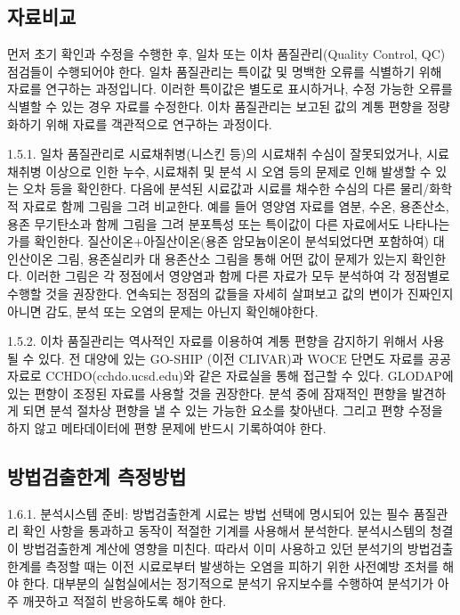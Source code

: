 \documentclass[
]{book}
\begin{document}
\hypertarget{uxc790uxb8ccuxbe44uxad50-1}{%
\subsection{자료비교}\label{uxc790uxb8ccuxbe44uxad50-1}}

먼저 초기 확인과 수정을 수행한 후, 일차 또는 이차 품질관리(Quality Control, QC) 점검들이 수행되어야 한다. 일차 품질관리는 특이값 및 명백한 오류를 식별하기 위해 자료를 연구하는 과정입니다. 이러한 특이값은 별도로 표시하거나, 수정 가능한 오류를 식별할 수 있는 경우 자료를 수정한다. 이차 품질관리는 보고된 값의 계통 편향을 정량화하기 위해 자료를 객관적으로 연구하는 과정이다.

1.5.1. 일차 품질관리로 시료채취병(니스킨 등)의 시료채취 수심이 잘못되었거나, 시료채취병 이상으로 인한 누수, 시료채취 및 분석 시 오염 등의 문제로 인해 발생할 수 있는 오차 등을 확인한다. 다음에 분석된 시료값과 시료를 채수한 수심의 다른 물리/화학적 자료로 함께 그림을 그려 비교한다. 예를 들어 영양염 자료를 염분, 수온, 용존산소, 용존 무기탄소과 함께 그림을 그려 분포특성 또는 특이값이 다른 자료에서도 나타나는가를 확인한다. 질산이온+아질산이온(용존 암모늄이온이 분석되었다면 포함하여) 대 인산이온 그림, 용존실리카 대 용존산소 그림을 통해 어떤 값이 문제가 있는지 확인한다. 이러한 그림은 각 정점에서 영양염과 함께 다른 자료가 모두 분석하여 각 정점별로 수행할 것을 권장한다. 연속되는 정점의 값들을 자세히 살펴보고 값의 변이가 진짜인지 아니면 감도, 분석 또는 오염의 문제는 아닌지 확인해야한다.

1.5.2. 이차 품질관리는 역사적인 자료를 이용하여 계통 편향을 감지하기 위해서 사용될 수 있다. 전 대양에 있는 GO-SHIP (이전 CLIVAR)과 WOCE 단면도 자료를 공공자료로 CCHDO(cchdo.ucsd.edu)와 같은 자료실을 통해 접근할 수 있다. GLODAP에 있는 편향이 조정된 자료를 사용할 것을 권장한다. 분석 중에 잠재적인 편향을 발견하게 되면 분석 절차상 편향을 낼 수 있는 가능한 요소를 찾아낸다. 그리고 편향 수정을 하지 않고 메타데이터에 편향 문제에 반드시 기록하여야 한다.

\hypertarget{uxbc29uxbc95uxac80uxcd9cuxd55cuxacc4-uxce21uxc815uxbc29uxbc95-1}{%
\subsection{방법검출한계 측정방법}\label{uxbc29uxbc95uxac80uxcd9cuxd55cuxacc4-uxce21uxc815uxbc29uxbc95-1}}

1.6.1. 분석시스템 준비: 방법검출한계 시료는 방법 선택에 명시되어 있는 필수 품질관리 확인 사항을 통과하고 동작이 적절한 기계를 사용해서 분석한다. 분석시스템의 청결이 방법검출한계 계산에 영향을 미친다. 따라서 이미 사용하고 있던 분석기의 방법검출한계를 측정할 때는 이전 시료로부터 발생하는 오염을 피하기 위한 사전예방 조처를 해야 한다. 대부분의 실험실에서는 정기적으로 분석기 유지보수를 수행하여 분석기가 아주 깨끗하고 적절히 반응하도록 해야 한다.
\end{document}
